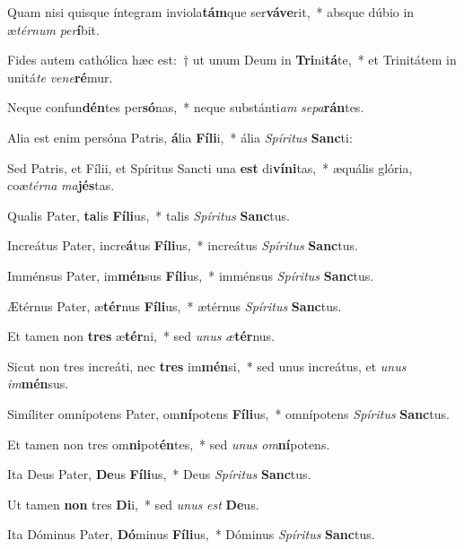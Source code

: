 \item Quam nisi quisque íntegram inviola\textbf{tám}que ser\textbf{vá}\textbf{ve}rit,~* absque dúbio in æ\textit{tér}\textit{num} \textit{per}\textbf{í}bit.
\item Fides autem cathólica hæc est:~† ut unum Deum in \textbf{Tri}ni\textbf{tá}te,~* et Trinitátem in unitá\textit{te} \textit{ve}\textit{ne}\textbf{ré}mur.
\item Neque confun\textbf{dén}tes per\textbf{só}nas,~* neque substánti\textit{am} \textit{se}\textit{pa}\textbf{rán}tes.
\item Alia est enim persóna Patris, \textbf{á}lia \textbf{Fí}\textbf{li}i,~* ália \textit{Spí}\textit{ri}\textit{tus} \textbf{Sanc}ti:
\item Sed Patris, et Fílii, et Spíritus Sancti una \textbf{est} di\textbf{ví}\textbf{ni}tas,~* æquális glória, coæ\textit{tér}\textit{na} \textit{ma}\textbf{jés}tas.
\item Qualis Pater, \textbf{ta}lis \textbf{Fí}\textbf{li}us,~* talis \textit{Spí}\textit{ri}\textit{tus} \textbf{Sanc}tus.
\item Increátus Pater, incre\textbf{á}tus \textbf{Fí}\textbf{li}us,~* increátus \textit{Spí}\textit{ri}\textit{tus} \textbf{Sanc}tus.
\item Imménsus Pater, im\textbf{mén}sus \textbf{Fí}\textbf{li}us,~* imménsus \textit{Spí}\textit{ri}\textit{tus} \textbf{Sanc}tus.
\item Ætérnus Pater, æ\textbf{tér}nus \textbf{Fí}\textbf{li}us,~* ætérnus \textit{Spí}\textit{ri}\textit{tus} \textbf{Sanc}tus.
\item Et tamen non \textbf{tres} æ\textbf{tér}ni,~* sed \textit{u}\textit{nus} \textit{æ}\textbf{tér}nus.
\item Sicut non tres increáti, nec \textbf{tres} im\textbf{mén}si,~* sed unus increátus, et \textit{u}\textit{nus} \textit{im}\textbf{mén}sus.
\item Simíliter omnípotens Pater, om\textbf{ní}potens \textbf{Fí}\textbf{li}us,~* omnípotens \textit{Spí}\textit{ri}\textit{tus} \textbf{Sanc}tus.
\item Et tamen non tres om\textbf{ni}pot\textbf{én}tes,~* sed \textit{u}\textit{nus} \textit{om}\textbf{ní}potens.
\item Ita Deus Pater, \textbf{De}us \textbf{Fí}\textbf{li}us,~* Deus \textit{Spí}\textit{ri}\textit{tus} \textbf{Sanc}tus.
\item Ut tamen \textbf{non} tres \textbf{Di}i,~* sed \textit{u}\textit{nus} \textit{est} \textbf{De}us.
\item Ita Dóminus Pater, \textbf{Dó}minus \textbf{Fí}\textbf{li}us,~* Dóminus \textit{Spí}\textit{ri}\textit{tus} \textbf{Sanc}tus.
